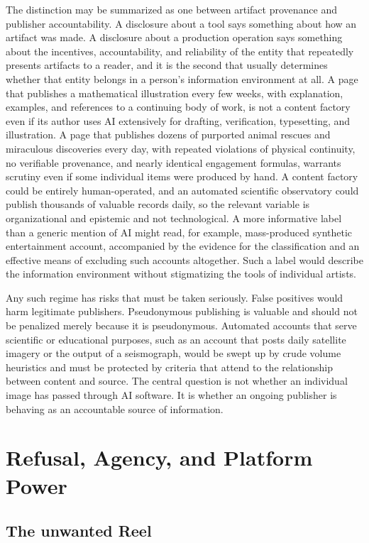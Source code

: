 \documentclass[12pt]{article}
\theoremstyle{plain}
\theoremstyle{definition}
\theoremstyle{remark}
\begin{document}
The distinction may be summarized as one between artifact provenance and publisher accountability. A disclosure about a tool says something about how an artifact was made. A disclosure about a production operation says something about the incentives, accountability, and reliability of the entity that repeatedly presents artifacts to a reader, and it is the second that usually determines whether that entity belongs in a person's information environment at all. A page that publishes a mathematical illustration every few weeks, with explanation, examples, and references to a continuing body of work, is not a content factory even if its author uses AI extensively for drafting, verification, typesetting, and illustration. A page that publishes dozens of purported animal rescues and miraculous discoveries every day, with repeated violations of physical continuity, no verifiable provenance, and nearly identical engagement formulas, warrants scrutiny even if some individual items were produced by hand. A content factory could be entirely human-operated, and an automated scientific observatory could publish thousands of valuable records daily, so the relevant variable is organizational and epistemic and not technological. A more informative label than a generic mention of AI might read, for example, mass-produced synthetic entertainment account, accompanied by the evidence for the classification and an effective means of excluding such accounts altogether. Such a label would describe the information environment without stigmatizing the tools of individual artists.

Any such regime has risks that must be taken seriously. False positives would harm legitimate publishers. Pseudonymous publishing is valuable and should not be penalized merely because it is pseudonymous. Automated accounts that serve scientific or educational purposes, such as an account that posts daily satellite imagery or the output of a seismograph, would be swept up by crude volume heuristics and must be protected by criteria that attend to the relationship between content and source. The central question is not whether an individual image has passed through AI software. It is whether an ongoing publisher is behaving as an accountable source of information.

\section{Refusal, Agency, and Platform Power}

\subsection{The unwanted Reel}
\end{document}
